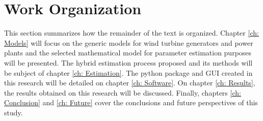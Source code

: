 \section{Work Organization}

This section summarizes how the remainder of the text is organized. Chapter \ref{ch: Models} will focus on the generic models for wind turbine generators and power plants and the selected mathematical model for parameter estimation purposes will be presented. The hybrid estimation process proposed and its methods will be subject of chapter \ref{ch: Estimation}. The python package and GUI created in this research will be detailed on chapter \ref{ch: Software}. On chapter \ref{ch: Results}, the results obtained on this research will be discussed. Finally, chapters \ref{ch: Conclusion} and \ref{ch: Future} cover the conclusions and future perspectives of this study.